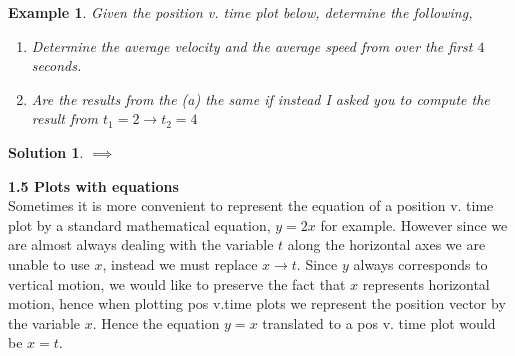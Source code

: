 \documentclass[12pt]{article}
\theoremstyle{break}
\newtheorem{ex}[thm]{Example}
\newtheorem*{soln}{Solution}
\begin{document}
\begin{ex}
    Given the position v. time plot below, determine the following,

    \begin{enumerate} [label = (\alph*)]
        \item Determine the average velocity and the average speed from over the first $4$ seconds.
        \item Are the results from the (a) the same if instead I asked you to compute the result from $t_1 = 2 \rightarrow t_2 = 4$
    \end{enumerate}

    \begin{center}
    \end{center}

\end{ex}

\begin{soln}
$\implies$
\vspace*{7cm}

\end{soln}
\textbf{\large{1.5 \hspace*{0.2cm} Plots with equations}}\\
Sometimes it is more convenient to represent the equation of a position v. time plot by a standard mathematical equation, $y = 2x$ for example. However since we are almost always dealing with the variable $t$ along the horizontal axes we are unable to use $x$, instead we must replace $x \rightarrow t$. Since $y$ always corresponds to vertical motion, we would like to preserve the fact that $x$ represents horizontal motion, hence when plotting pos v.time plots we represent the position vector by the variable $x$. Hence the equation $y = x$ translated to a pos v. time plot would be $x = t$. 
\end{document}
